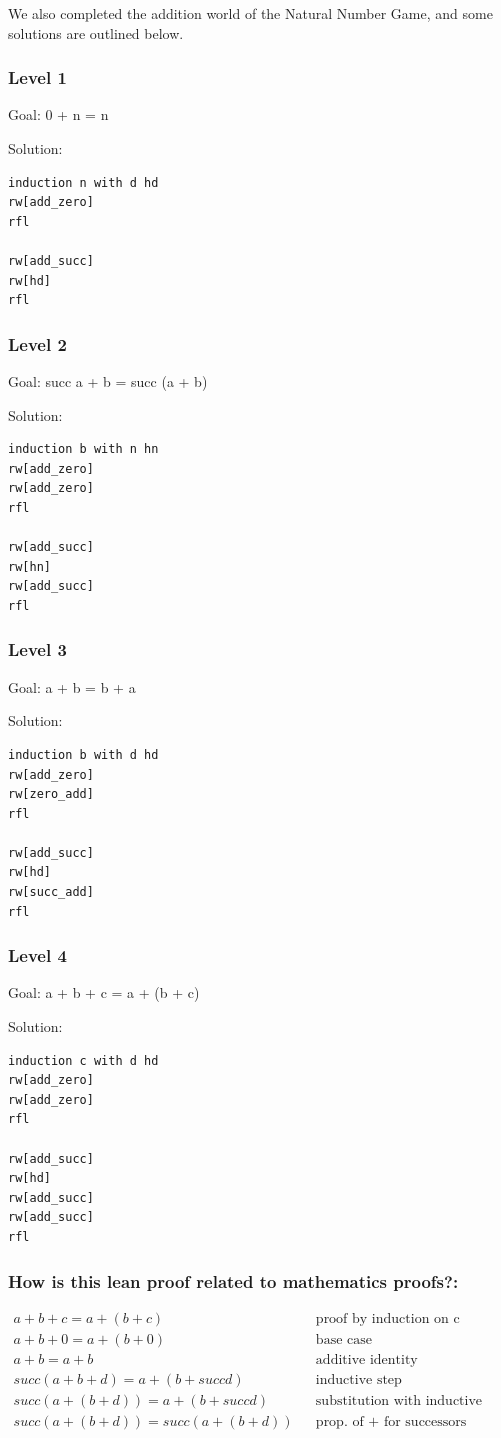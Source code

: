 \documentclass{article}
\theoremstyle{theorem}
\theoremstyle{definition}
\theoremstyle{remark}
\begin{document}
We also completed the addition world of the Natural Number Game, and some solutions are outlined below.
\subsubsection*{Level 1}
Goal: 0 + n = n

Solution:
\begin{lstlisting}
induction n with d hd
rw[add_zero]
rfl

rw[add_succ]
rw[hd]
rfl
\end{lstlisting}
\subsubsection*{Level 2}
Goal: succ a + b = succ (a + b)

Solution:
\begin{lstlisting}
induction b with n hn
rw[add_zero]
rw[add_zero]
rfl

rw[add_succ]
rw[hn]
rw[add_succ]
rfl
\end{lstlisting}
\subsubsection*{Level 3}
Goal: a + b = b + a

Solution:
\begin{lstlisting}
induction b with d hd
rw[add_zero]
rw[zero_add]
rfl

rw[add_succ]
rw[hd]
rw[succ_add]
rfl
\end{lstlisting}
\subsubsection*{Level 4}
Goal: a + b + c = a + (b + c)

Solution:
\begin{lstlisting}
induction c with d hd
rw[add_zero]
rw[add_zero]
rfl

rw[add_succ]
rw[hd]
rw[add_succ]
rw[add_succ]
rfl
\end{lstlisting}
\subsubsection*{How is this lean proof related to mathematics proofs?:}
\begin{align}
  a + b + c = a + (b+c)   &      &\text{proof by induction on c} \\
  a + b + 0 = a + (b+0)   &      &\text{base case} \\
  a + b = a + b        &      &\text{additive identity} \\
  succ(a + b + d) = a + (b+succd)&    &\text{inductive step} \\
  succ(a + (b + d)) = a + (b+succd)&      &\text{substitution with inductive hypothesis} \\
  succ(a + (b + d)) = succ(a + (b+d))&      &\text{prop. of + for successors} \\
\end{align}
\end{document}
